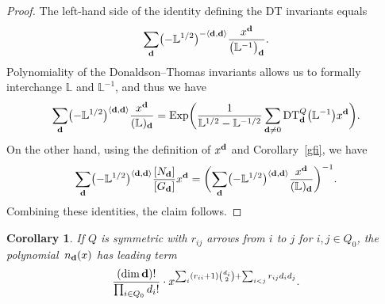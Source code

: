 \documentclass[pdftex]{sigma}
\numberwithin{equation}{section}
\newtheorem{Corollary}[Theorem]{Corollary}
\theoremstyle{definition}
\begin{document}
\begin{proof} The left-hand side of the identity defining the DT invariants equals
\[\sum_{\bf d}\bigl(-\mathbb{L}^{1/2}\bigr)^{-\langle{\bf d},{\bf d}\rangle}\frac{x^{\bf d}}{\bigl(\mathbb{L}^{-1}\bigr)_{\bf d}}.\]
Polynomiality of the Donaldson--Thomas invariants allows us to formally interchange $\mathbb{L}$ and $\mathbb{L}^{-1}$, and thus we have
\[\sum_{\bf d}\bigl(-\mathbb{L}^{1/2}\bigr)^{\langle{\bf d},{\bf d}\rangle}\frac{x^{\bf d}}{(\mathbb{L})_{\bf d}}=\operatorname{Exp}\biggl(\frac{1}{\mathbb{L}^{1/2}-\mathbb{L}^{-1/2}}\sum_{{\bf d}\not=0}{\rm DT}^Q_{\bf d}\bigl(\mathbb{L}^{-1}\bigr)x^{\bf d}\biggr).\]
On the other hand, using the definition of $x^{\bf d}$ and Corollary~\ref{gfi}, we have
\[\sum_\mathbf{d}\bigl(-\mathbb{L}^{1/2}\bigr)^{\langle\mathbf{d},\mathbf{d}\rangle} \frac{[N_\mathbf{d}]}{[G_\mathbf{d}]}x^\mathbf{d}=\biggl(\sum_{\bf d}\bigl(-\mathbb{L}^{1/2}\bigr)^{\langle{\bf d},{\bf d}\rangle}\frac{x^{\bf d}}{(\mathbb{L})_{\bf d}}\biggr)^{-1}.\]
Combining these identities, the claim follows.\end{proof}

\begin{Corollary} If $Q$ is symmetric with $r_{ij}$ arrows from $i$ to $j$ for $i,j\in Q_0$, the polynomial~$n_{\bf d}(x)$ has leading term
\[\frac{(\dim {\bf d})!}{\prod_{i\in Q_0}d_i!}\cdot x^{\sum_{i}(r_{ii}+1){d_i\choose 2}+\sum_{i<j}r_{ij}d_id_j}.\]
\end{Corollary}
\end{document}
